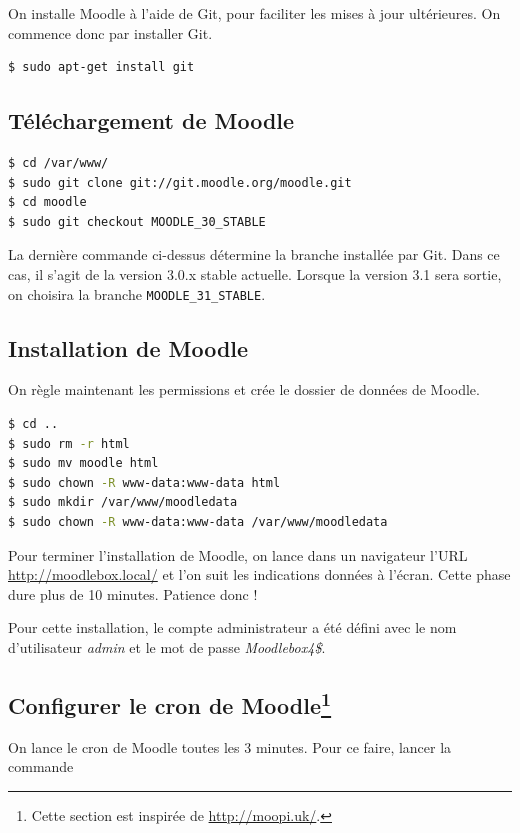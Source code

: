 \documentclass[11pt]{article}
\begin{document}
On installe Moodle à l'aide de Git, pour faciliter les mises à jour ultérieures. On commence donc par installer Git.

\begin{lstlisting}[language=bash]
$ sudo apt-get install git
\end{lstlisting}

\subsection{Téléchargement de Moodle}

\begin{lstlisting}[language=bash]
$ cd /var/www/
$ sudo git clone git://git.moodle.org/moodle.git
$ cd moodle
$ sudo git checkout MOODLE_30_STABLE
\end{lstlisting}
La dernière commande ci-dessus détermine la branche installée par Git. Dans ce cas, il s'agit de la version 3.0.x stable actuelle. Lorsque la version 3.1 sera sortie, on choisira la branche \lstinline{MOODLE_31_STABLE}.

\subsection{Installation de Moodle}

On règle maintenant les permissions et crée le dossier de données de Moodle.
\begin{lstlisting}[language=bash]
$ cd ..
$ sudo rm -r html
$ sudo mv moodle html
$ sudo chown -R www-data:www-data html
$ sudo mkdir /var/www/moodledata
$ sudo chown -R www-data:www-data /var/www/moodledata
\end{lstlisting}

Pour terminer l'installation de Moodle, on lance dans un navigateur l'URL \url{http://moodlebox.local/} et l'on suit les indications données à l'écran. Cette phase dure plus de 10 minutes. Patience donc !

Pour cette installation, le compte administrateur a été défini avec le nom d'utilisateur \emph{admin} et le mot de passe \emph{Moodlebox4\$}.

\subsection[Configurer le cron de Moodle]{Configurer le cron de Moodle\footnote{Cette section est inspirée de \url{http://moopi.uk/}.}}

On lance le cron de Moodle toutes les 3 minutes. Pour ce faire, lancer la commande
\end{document}

